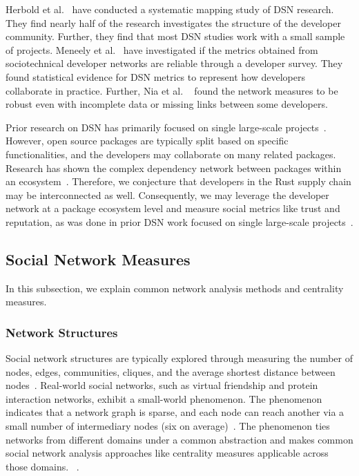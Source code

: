 \documentclass[10pt,journal,compsoc]{IEEEtran}
\begin{document}
Herbold et al.~\cite{herbold2021systematic} have conducted a systematic mapping study of DSN research. They find nearly half of the research investigates the structure of the developer community. Further, they find that most DSN studies work with a small sample of projects. 
Meneely et al.~\cite{meneely2011socio} have investigated if the metrics obtained from sociotechnical developer networks are reliable through a developer survey. They found statistical evidence for DSN metrics to represent how developers collaborate in practice. Further, Nia et al. ~\cite{nia2010validity} found the network measures to be robust even with incomplete data or missing links between some developers.


Prior research on DSN has primarily focused on single large-scale projects~\cite{herbold2021systematic}. However, open source packages are typically split based on specific functionalities, and the developers may collaborate on many related packages. Research has shown the complex dependency network between packages within an ecosystem~\cite{kikas2017structure}. Therefore, we conjecture that developers in the Rust supply chain may be interconnected as well. Consequently, we may leverage the developer network at a package ecosystem level and measure social metrics like trust and reputation, as was done in prior DSN work focused on single large-scale projects~\cite{meneely2011socio, bosu2014impact}.

\subsection{Social Network Measures}
In this subsection, we explain common network analysis methods and centrality measures.  

\subsubsection{Network Structures} 
Social network structures are typically explored through measuring the number of nodes, edges, communities, cliques, and the average shortest distance between nodes~\cite{freeman2004development}.
Real-world social networks, such as virtual friendship and protein interaction networks, exhibit a small-world phenomenon. The phenomenon indicates that a network graph is sparse, and each node can reach another via a small number of intermediary nodes (six on average)~\cite{sherchan2013survey}. 
The phenomenon ties networks from different domains under a common abstraction and makes common social network analysis approaches like centrality measures applicable across those domains. ~\cite{sherchan2013survey}.
\end{document}
